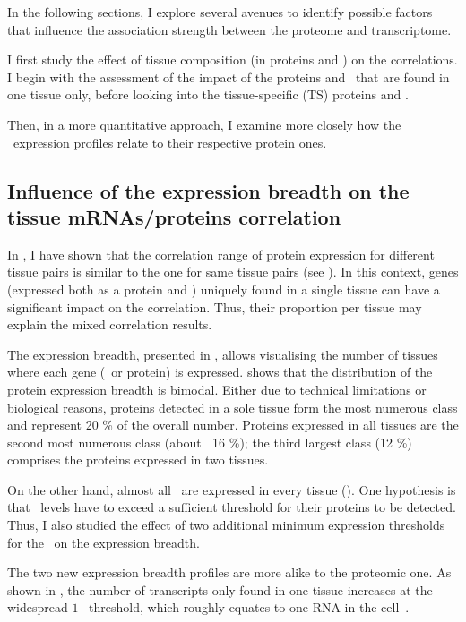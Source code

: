 In the following sections,
I explore several avenues to identify possible factors
that influence the association strength
between the proteome and transcriptome.\mybr\

I first study the effect of tissue composition (in proteins and \mRNAs)
on the correlations.
I begin with the assessment of the impact of the proteins and \mRNAs\
that are found in one tissue only,
before looking into the tissue-specific (\gls{TS}) proteins and \mRNAs{}.

Then, in a more quantitative approach,
I examine more closely how the \mRNA\ expression profiles relate
to their respective protein ones.

\subsection{Influence of the expression breadth on the tissue %
\texorpdfstring{\MakeLowercase{m}RNAs/proteins}{mRNAs/proteins} correlation}

In ,
I have shown that
the correlation range of protein expression for different tissue pairs
is similar to the one for same tissue pairs
(see ).
In this context,
genes (expressed both as a protein and \mRNA)
uniquely found in a single tissue can have a significant impact on the correlation.
Thus, their proportion per tissue may explain
the mixed correlation results.\mybr\

The expression breadth, presented in ,
allows visualising the number of tissues
where each gene (\mRNA\ or protein) is expressed.
 shows that
the distribution of the protein expression breadth is bimodal.
Either due to technical limitations or biological reasons,
proteins detected in a sole tissue form
the most numerous class and represent 20 \% of the overall number.
Proteins expressed in all tissues are the second most numerous class (about $~$ 16 \%);
the third largest class (12 \%) comprises the proteins expressed in two tissues.\mybr\

On the other hand,
almost all \mRNAs\ are expressed in every tissue ().
One hypothesis is that \mRNAs\ levels have to exceed a sufficient threshold
for their proteins to be detected.
Thus, I also studied the effect of
two additional minimum expression thresholds for the \mRNAs\
on the expression breadth.\mybr\

The two new expression breadth profiles are more alike
to the proteomic one.
As shown in \Cref{fig:mRNAbreadth1},
the number of transcripts only found in one tissue increases
at the widespread $1$ \FPKM\ threshold,
which roughly equates to one \gls{RNA} in the cell~.

